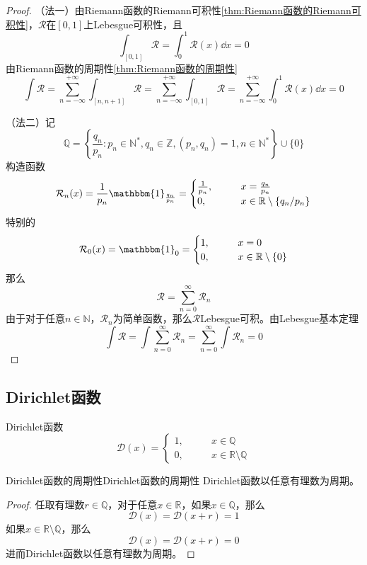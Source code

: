 \documentclass[lang = cn, scheme = chinese, thmcnt = section]{elegantbook}
\newcommand{\N}{\mathbb{N}}            %
\newcommand{\R}{\mathbb{R}}            %
\newcommand{\Q}{\mathbb{Q}}            %
\newcommand{\Z}{\mathbb{Z}}            %
\begin{document}
\begin{proof}
	（法一）由Riemann函数的Riemann可积性\ref{thm:Riemann函数的Riemann可积性}，$\mathcal{R}$在$[0,1]$上Lebesgue可积性，且
	$$
	\int_{[0,1]}\mathcal{R}=\int_{0}^{1}\mathcal{R}(x)\dd x=0
	$$
	由Riemann函数的周期性\ref{thm:Riemann函数的周期性}
	$$
	\int\mathcal{R}
	=\sum_{n=-\infty}^{+\infty}\int_{[n,n+1]}\mathcal{R}
	=\sum_{n=-\infty}^{+\infty}\int_{[0,1]}\mathcal{R}
	=\sum_{n=-\infty}^{+\infty}\int_{0}^{1}\mathcal{R}(x)\dd x
	=0
	$$
	
	（法二）记
	$$
	\Q=\left\{ \frac{q_n}{p_n}:p_n\in\N^*,q_n\in\Z,(p_n,q_n)=1,n\in\N^* \right\}\cup\{0\}
	$$
	构造函数
	$$
	\mathcal{R}_n(x)=\frac{1}{p_n}\mathbbm{1}_{\frac{q_n}{p_n}}=
	\begin{cases}
		\frac{1}{p_n},\qquad & x=\frac{q_n}{p_n}\\
		0,\qquad & x\in \R\setminus\{q_n/p_n\}
	\end{cases}
	$$
	特别的
	$$
	\mathcal{R}_0(x)=\mathbbm{1}_0
	=\begin{cases}
		1,\qquad & x=0\\
		0,\qquad & x\in \R\setminus\{0\}
	\end{cases}
	$$
	那么
	$$
	\mathcal{R}=\sum_{n=0}^{\infty}\mathcal{R}_n
	$$
	由于对于任意$n\in\N$，$\mathcal{R}_n$为简单函数，那么$\mathcal{R}$Lebesgue可积。由Lebesgue基本定理
	$$
	\int\mathcal{R}=\int\sum_{n=0}^{\infty}\mathcal{R}_n
	=\sum_{n=0}^{\infty}\int\mathcal{R}_n=0
	$$
\end{proof}

\subsection{Dirichlet函数}

\begin{definition}{Dirichlet函数}
	$$
	\mathcal{D}(x)=\begin{cases}
		1,\qquad & x\in\Q\\
		0,\qquad & x\in\R\setminus \Q
	\end{cases}
	$$
\end{definition}

\begin{theorem}{Dirichlet函数的周期性}{Dirichlet函数的周期性}
	Dirichlet函数以任意有理数为周期。
\end{theorem}

\begin{proof}
	任取有理数$r\in \Q$，对于任意$x\in\R$，如果$x\in\Q$，那么
	$$
	\mathcal{D}(x)=\mathcal{D}(x+r)=1
	$$
	如果$x\in\R\setminus\Q$，那么
	$$
	\mathcal{D}(x)=\mathcal{D}(x+r)=0
	$$
	进而Dirichlet函数以任意有理数为周期。
\end{proof}
\end{document}
